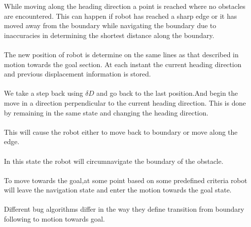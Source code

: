 \documentclass[fontsize=12pt, %
                             paper=a4, %
                             oneside, %
                             captions=tableheading,
                             index=totoc,
                             hyperref]{labbook}
\begin{document}
While moving along the heading direction a point is reached where no
obstacles are encountered.
This can happen if robot has reached a sharp edge or it has moved
away from the boundary while navigating the boundary due to inaccuracies
in determining the shortest distance along the boundary.
\\\\
The new position of robot is determine on the same lines
as that described in motion towards the goal section.
At each instant the current heading direction and previous displacement
information is stored.
\\\\
We take a step back using $\delta{D}$ and go back 
to the last position.And begin the move in a direction perpendicular to the current heading direction.
This is done by remaining in the same state and changing the heading direction.
\\\\
This will cause the robot either to move back to boundary or move along
the edge.
\\\\
In this state the robot will circumnavigate the boundary of the obstacle.
\\\\
To move towards the goal,at some point based on some predefined
criteria robot will leave the navigation state and enter
the motion towards the goal state.
\\\\
Different bug algorithms differ in the way they define transition from
boundary following to motion towards goal.
\end{document}
